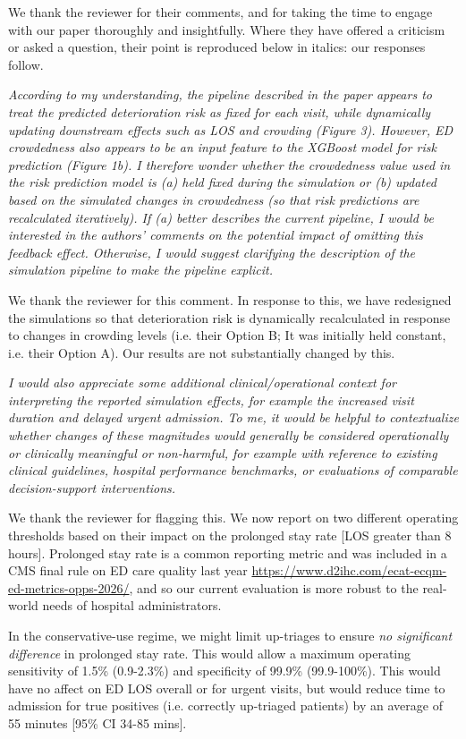 We thank the reviewer for their comments, and for taking the time to engage with our paper thoroughly and insightfully. Where they have offered a criticism or asked a question, their point is reproduced below in italics: our responses follow.


\textit{     According to my understanding, the pipeline described in the paper appears to treat the predicted deterioration risk as fixed for each visit, while dynamically updating downstream effects such as LOS and crowding (Figure 3). However, ED crowdedness also appears to be an input feature to the XGBoost model for risk prediction (Figure 1b). I therefore wonder whether the crowdedness value used in the risk prediction model is (a) held fixed during the simulation or (b) updated based on the simulated changes in crowdedness (so that risk predictions are recalculated iteratively). If (a) better describes the current pipeline, I would be interested in the authors’ comments on the potential impact of omitting this feedback effect. Otherwise, I would suggest clarifying the description of the simulation pipeline to make the pipeline explicit.}

We thank the reviewer for this comment. In response to this, we have redesigned the simulations so that deterioration risk is dynamically recalculated in response to changes in crowding levels (i.e. their Option B; It was initially held constant, i.e. their Option A). Our results are not substantially changed by this.

\textit{
     I would also appreciate some additional clinical/operational context for interpreting the reported simulation effects, for example the increased visit duration and delayed urgent admission. To me, it would be helpful to contextualize whether changes of these magnitudes would generally be considered operationally or clinically meaningful or non-harmful, for example with reference to existing clinical guidelines, hospital performance benchmarks, or evaluations of comparable decision-support interventions.}

We thank the reviewer for flagging this. We now report on two different operating thresholds based on their impact on the prolonged stay rate [LOS greater than 8 hours]. Prolonged stay rate is a common reporting metric and was included in a CMS final rule on ED care quality last year \url{https://www.d2ihc.com/ecat-ecqm-ed-metrics-opps-2026/}, and so our current evaluation is more robust to the real-world needs of hospital administrators.

In the conservative-use regime, we might limit up-triages to ensure \textit{no significant difference} in prolonged stay rate. This would allow a maximum operating sensitivity of 1.5\% (0.9-2.3\%) and specificity of 99.9\% (99.9-100\%). This would have no affect on ED LOS overall or for urgent visits, but would reduce time to admission for true positives (i.e. correctly up-triaged patients) by an average of 55 minutes [95\% CI 34-85 mins]. 

